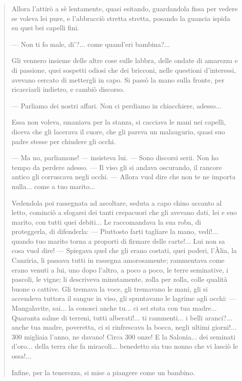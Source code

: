 \documentclass{book}
\newcounter{mar}
\begin{document}
\begin{quote}
Allora l’attirò a sè lentamente, quasi esitando, guardandola fissa per vedere se voleva lei pure, e l’abbracciò stretta stretta, posando la guancia ispida su quei bei capelli fini.

— Non ti fo male, di’?... come quand’eri bambina?...

Gli vennero insieme delle altre cose sulle labbra, delle ondate di amarezza e di passione, quei sospetti odiosi che dei bricconi, nelle questioni d’interessi, avevano cercato di mettergli in capo. Si passò la mano sulla fronte, per ricacciarli indietro, e cambiò discorso.

— Parliamo dei nostri affari. Non ci perdiamo in chiacchiere, adesso...

Essa non voleva, smaniava per la stanza, si cacciava le mani nei capelli, diceva che gli lacerava il cuore, che gli pareva un malaugurio, quasi suo padre stesse per chiudere gli occhi.

— Ma no, parliamone! — insisteva lui. — Sono discorsi serii. Non ho tempo da perdere adesso. — Il viso gli si andava oscurando, il rancore antico gli corruscava negli occhi. — Allora vuol dire che non te ne importa nulla... come a tuo marito...

Vedendola poi rassegnata ad ascoltare, seduta a capo chino accanto al letto, cominciò a sfogarsi dei tanti crepacuori che gli avevano dati, lei e suo marito, con tutti quei debiti... Le raccomandava la sua roba, di proteggerla, di difenderla: — Piuttosto farti tagliare la mano, vedi!... quando tuo marito torna a proporti di firmare delle carte!... Lui non sa cosa vuol dire! — Spiegava quel che gli erano costati, quei poderi, l’Àlia, la Canziria, li passava tutti in rassegna amorosamente; rammentava come erano venuti a lui, uno dopo l’altro, a poco a poco, le terre seminative, i pascoli, le vigne; li descriveva minutamente, zolla per zolla, colle qualità buone o cattive. Gli tremava la voce, gli tremavano le mani, gli si accendeva tuttora il sangue in viso, gli spuntavano le lagrime agli occhi: — Mangalavite, sai... la conosci anche tu... ci sei stata con tua madre... Quaranta salme di terreni, tutti alberati!... ti rammenti... i belli aranci?... anche tua madre, poveretta, ci si rinfrescava la bocca, negli ultimi giorni!... 300 migliaia l’anno, ne davano! Circa 300 onze! E la Salonia... dei seminati d’oro... della terra che fa miracoli... benedetto sia tuo nonno che vi lasciò le ossa!...

Infine, per la tenerezza, si mise a piangere come un bambino.


\end{quote}
\end{document}
